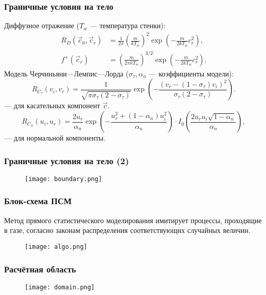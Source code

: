 \documentclass[onlymath]{beamer}
\begin{document}
\begin{frame}
  \frametitle{Граничные условия на тело}
  Диффузное отражение ($T_w$ — температура стенки):
  \begin{equation*}
    \begin{aligned}
      R_D(\vec{c}_0, \vec{c}_r) &=
      \frac{1}{2\pi}\left(\frac{m}{kT_w}\right)^2\exp\left(-\frac{m}{2kT_w}c^2_r\right),\\
      f^+(\vec{c}_r) &= \left(\frac{m}{2\pi k
          T_w}\right)^{3/2}\exp\left(-\frac{m}{2kT_w}c^2_r\right).
    \end{aligned}
  \end{equation*}
  Модель Черчиньяни—Лемпис—Лорда ($\sigma_{\tau}, \alpha_n$ —
  коэффициенты модели):
  \begin{equation*}
    \label{eq:cll-tau}
    R_{C_{\tau}}(v_i, v_r) = \frac{1}{\sqrt{\pi \sigma_{\tau} (2-\sigma_{\tau})}}
    \exp{\left(-\frac{(v_r-(1-\sigma_{\tau})v_i)^2}{\sigma_{\tau}(2-\sigma_{\tau})}\right)}.
  \end{equation*} — для касательных компонент $\vec{c}$.
  \begin{equation*}
    R_{C_{n}}(u_i, u_r) = \frac{2 u_r}{\alpha_n}
    \exp{\left(-\frac{u^2_r+(1-\alpha_n)u^2_i}{\alpha_n}\right)} \cdot
    I_0\left(\frac{2 u_r u_i \sqrt{1-\alpha_n}}{\alpha_n}\right),
  \end{equation*} — для нормальной компоненты.
\end{frame}

\begin{frame}
  \frametitle{Граничные условия на тело (2)}
  \begin{figure}[!h]
    \centering
    \texttt{[image: boundary.png]}
  \end{figure}
\end{frame}

\begin{frame}
  \frametitle{Блок-схема ПСМ}
  Метод прямого статистического моделирования имитирует процессы,
  проходящие в газе, согласно законам распределения соответствующих
  случайных величин.
  \begin{figure}[!h]
    \centering
    \texttt{[image: algo.png]}
  \end{figure}  
\end{frame}

\begin{frame}
  \frametitle{Расчётная область}
  \begin{figure}[!h]
    \centering
    \texttt{[image: domain.png]}
  \end{figure}   
\end{frame}
\end{document}
